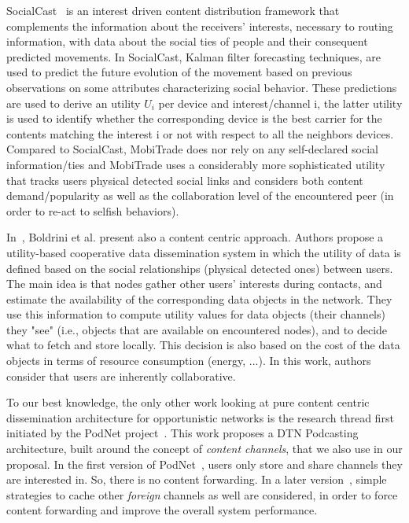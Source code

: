 SocialCast~\cite{SocialCast2, SocialCast} is an interest driven content distribution framework that complements the information about the receivers' interests, necessary to routing information, with data about the social ties of people and their consequent predicted movements. In SocialCast, Kalman filter forecasting techniques, are used to predict the future evolution of the movement based on previous observations on some attributes characterizing social behavior. These predictions are used to derive an utility $U_i$ per device and interest/channel i, the latter utility is used to identify whether the corresponding device is the best carrier for the contents matching
the interest i or not with respect to all the neighbors devices. Compared to SocialCast, MobiTrade does nor rely on any self-declared social information/ties and MobiTrade uses a considerably more sophisticated utility that tracks users physical detected social links and considers both content demand/popularity as well as the collaboration level of the encountered peer (in order to re-act to selfish behaviors).

In~\cite{Boldrini:2008:MDD}, Boldrini et al. present also a content centric approach. Authors propose a utility-based cooperative data dissemination system in which the utility of data is defined based on the social
relationships (physical detected ones) between users.  The main idea is that nodes gather other users' interests during contacts, and estimate the availability of the corresponding data objects in the network. They use this information to compute utility values for data objects (their channels) they "see" (i.e., objects that are available on encountered nodes), and to decide what to fetch and store locally. This decision is also based on the cost of the data objects in terms of resource consumption (energy, ...). In this work, authors consider that users are inherently collaborative.

To our best knowledge, the only other work looking at pure content centric dissemination architecture for opportunistic networks is the research thread first initiated by the PodNet project~\cite{Podcasting:Secon07, May07wirelessopportunistic}. This work proposes a DTN Podcasting architecture, built around the concept of \emph{content channels}, that we also use in our proposal. In the first version of PodNet~\cite{May07wirelessopportunistic}, users only store and share channels they are interested in. So, there is no content forwarding. In a later version~\cite{Podcasting:Secon07}, simple strategies to cache other \emph{foreign} channels as well are considered, in order to force content forwarding and  improve the overall system performance. 
 
